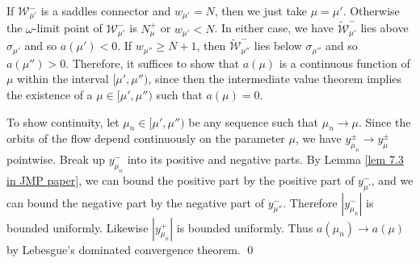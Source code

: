 \documentclass[11 pt]{article}
\renewcommand\({\left(}
\renewcommand\){\right)}
\newcommand\wt{\widetilde}
\newcommand\s{\sigma}
\newcommand\<{\langle}
\renewcommand\>{\rangle}
\newcommand\8{\infty}
\newcommand{\mc}{\mathcal}
\begin{document}
If $\mc{W}_{\mu'}^-$ is a saddles connector and $w_{\mu'} = N$, then we just take $\mu = \mu'$. Otherwise the $\omega$-limit point of $\mc{W}_{\mu'}^-$ is $N^+_\mu$ or $w_{\mu'} < N$. In either case, we have $\wt{\mc{W}}^-_{\mu'}$ lies above $\s_{\mu'}$ and so $a(\mu') < 0$. If $w_{\mu''}\geq N +1$, then $\wt{\mc{W}}^-_{\mu''}$ lies below $\s_{\mu''}$ and so $a(\mu'') > 0$. Therefore, it suffices to show that $a(\mu)$ is a continuous function of $\mu$ within the interval $[\mu', \mu'')$, since then the intermediate value theorem implies the existence of a $\mu \in [\mu', \mu'')$ such that $a(\mu) = 0$.  

To show continuity, let $\mu_n \in [\mu', \mu'')$ be any sequence such that $\mu_n \to \mu$. Since the orbits of the flow depend continuously on the parameter $\mu$, we have $y^\pm_{\mu_n} \to y^\pm_{\mu}$ pointwise. Break up $y^-_{\mu_n}$ into its positive and negative parts. By Lemma \ref{lem 7.3 in JMP paper}, we can bound the positive part by the positive part of $y^-_{\mu'}$, and we can bound the negative part by the negative part of $y^-_{\mu''}$. Therefore $|y^-_{\mu_n}|$ is bounded uniformly. Likewise $|y^+_{\mu_n}|$ is bounded uniformly. Thus $a(\mu_n) \to a(\mu)$ by Lebesgue's dominated convergence theorem. 
\qed
\end{document}
